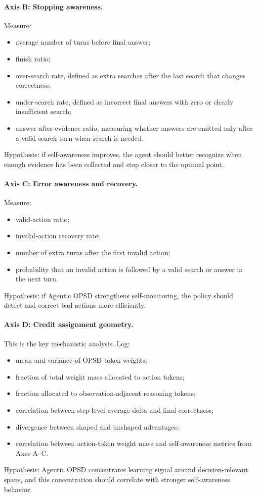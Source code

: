 \documentclass[11pt]{article}
\newcommand{\method}{Agentic OPSD}
\begin{document}
\paragraph{Axis B: Stopping awareness.}
Measure:
\begin{itemize}[leftmargin=1.5em]
    \item average number of turns before final answer;
    \item finish ratio;
    \item over-search rate, defined as extra searches after the last search that changes correctness;
    \item under-search rate, defined as incorrect final answers with zero or clearly insufficient search;
    \item answer-after-evidence ratio, measuring whether answers are emitted only after a valid search turn when search is needed.
\end{itemize}
Hypothesis: if self-awareness improves, the agent should better recognize when enough evidence has been collected and stop closer to the optimal point.

\paragraph{Axis C: Error awareness and recovery.}
Measure:
\begin{itemize}[leftmargin=1.5em]
    \item valid-action ratio;
    \item invalid-action recovery rate;
    \item number of extra turns after the first invalid action;
    \item probability that an invalid action is followed by a valid search or answer in the next turn.
\end{itemize}
Hypothesis: if \method{} strengthens self-monitoring, the policy should detect and correct bad actions more efficiently.

\paragraph{Axis D: Credit assignment geometry.}
This is the key mechanistic analysis. Log:
\begin{itemize}[leftmargin=1.5em]
    \item mean and variance of OPSD token weights;
    \item fraction of total weight mass allocated to action tokens;
    \item fraction allocated to observation-adjacent reasoning tokens;
    \item correlation between step-level average delta and final correctness;
    \item divergence between shaped and unshaped advantages;
    \item correlation between action-token weight mass and self-awareness metrics from Axes A--C.
\end{itemize}
Hypothesis: \method{} concentrates learning signal around decision-relevant spans, and this concentration should correlate with stronger self-awareness behavior.
\end{document}
